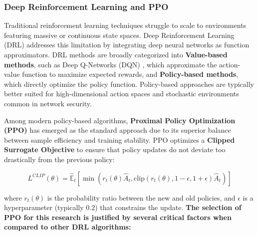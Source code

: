 \documentclass[12pt,a4paper]{report}
\begin{document}
\subsubsection*{Deep Reinforcement Learning and PPO}

Traditional reinforcement learning techniques struggle to scale to environments featuring massive or continuous state spaces. Deep Reinforcement Learning (DRL) addresses this limitation by integrating deep neural networks as function approximators. DRL methods are broadly categorized into \textbf{Value-based methods}, such as Deep Q-Networks (DQN) \cite{mnih2015}, which approximate the action-value function to maximize expected rewards, and \textbf{Policy-based methods}, which directly optimize the policy function. Policy-based approaches are typically better suited for high-dimensional action spaces and stochastic environments common in network security.

Among modern policy-based algorithms, \textbf{Proximal Policy Optimization (PPO)} has emerged as the standard approach due to its superior balance between sample efficiency and training stability. PPO optimizes a \textbf{Clipped Surrogate Objective} to ensure that policy updates do not deviate too drastically from the previous policy:

\begin{equation}
L^{CLIP}(\theta) = \hat{\mathbb{E}}_t \left[ \min(r_t(\theta)\hat{A}_t, \text{clip}(r_t(\theta), 1-\epsilon, 1+\epsilon)\hat{A}_t) \right]
\end{equation}

where $r_t(\theta)$ is the probability ratio between the new and old policies, and $\epsilon$ is a hyperparameter (typically 0.2) that constrains the update. \textbf{The selection of PPO for this research is justified by several critical factors when compared to other DRL algorithms:}
\end{document}
